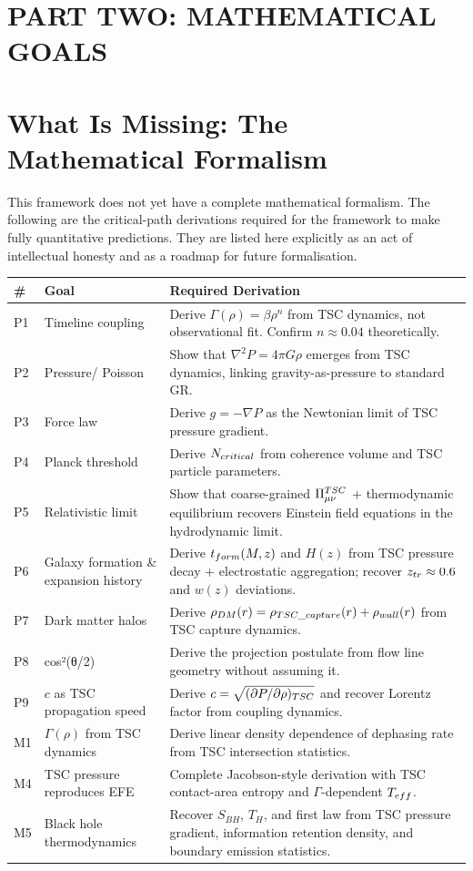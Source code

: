 \documentclass[11pt,a4paper]{article}
\let\cos\relax \let\sin\relax \let\tan\relax \let\exp\relax \let\log\relax
\let\text\relax \let\mathrm\relax \let\mathbf\relax \let\mathcal\relax
\def\texorpdfstring#1#2{#2}
\begin{document}
\section*{PART TWO: MATHEMATICAL GOALS}

\section{What Is Missing: The Mathematical Formalism}
This framework does not yet have a complete mathematical formalism. The following are the critical-path derivations required for the framework to make fully quantitative predictions. They are listed here explicitly as an act of intellectual honesty and as a roadmap for future formalisation.

\begin{center}
\begin{tabular}{p{2cm} p{5cm} p{6cm}}
\toprule
\textbf{\#} & \textbf{Goal} & \textbf{Required Derivation} \\
\midrule
P1 & Timeline coupling & Derive $\Gamma(\rho)= \beta\rho^n$ from TSC dynamics, not observational fit. Confirm $n \approx 0.04$ theoretically. \\
P2 & Pressure/ Poisson & Show that $\nabla^2 P= 4\pi G \rho$ emerges from TSC dynamics, linking gravity-as-pressure to standard GR. \\
P3 & Force law & Derive $g= -\nabla P$ as the Newtonian limit of TSC pressure gradient. \\
P4 & Planck threshold & Derive $N_{\text{critical}}$ from coherence volume and TSC particle parameters. \\
P5 & Relativistic limit & Show that coarse-grained $\Pi_{\mu\nu}^{\text{TSC}}$ + thermodynamic equilibrium recovers Einstein field equations in the hydrodynamic limit. \\
P6 & Galaxy formation \& expansion history & Derive $t_{\text{form}}(M,z)$ and $H(z)$ from TSC pressure decay + electrostatic aggregation; recover $z_{\text{tr}} \approx 0.6$ and $w(z)$ deviations. \\
P7 & Dark matter halos & Derive $\rho_{\text{DM}}(r)= \rho_{\text{TSC\_capture}}(r)+ \rho_{\text{wall}}(r)$ from TSC capture dynamics. \\
P8 & \texorpdfstring{$\cos^2(\theta/2)$}{cos²(θ/2)} & Derive the projection postulate from flow line geometry without assuming it. \\
P9 & $c$ as TSC propagation speed & Derive $c = \sqrt{(\partial P/\partial \rho)_{\text{TSC}}}$ and recover Lorentz factor from coupling dynamics. \\
M1 & $\Gamma(\rho)$ from TSC dynamics & Derive linear density dependence of dephasing rate from TSC intersection statistics. \\
M4 & TSC pressure reproduces EFE & Complete Jacobson-style derivation with TSC contact-area entropy and $\Gamma$-dependent $T_{\text{eff}}$. \\
M5 & Black hole thermodynamics & Recover $S_{BH}$, $T_H$, and first law from TSC pressure gradient, information retention density, and boundary emission statistics. \\
\bottomrule
\end{tabular}
\end{center}
\end{document}
